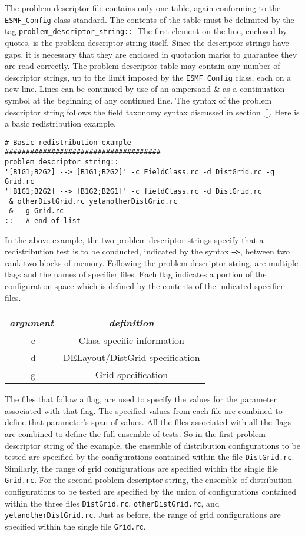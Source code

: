 The problem descriptor file contains only one table, again conforming to the \texttt{ESMF\_Config} class standard. The contents of the table must be delimited by the tag \texttt{problem\_descriptor\_string::}. The first element on the line, enclosed by quotes, is the problem descriptor string itself. Since the descriptor strings have gaps, it is necessary that they are enclosed in quotation marks to guarantee they are read correctly. The problem descriptor table may contain any number of descriptor strings, up to the limit imposed by the \texttt{ESMF\_Config} class, each on a new line. Lines can be continued by use of an ampersand {\&} as a continuation symbol at the beginning of any continued line. The syntax of the problem descriptor string follows the field taxonomy syntax discussed in section~\ref{}. Here is a basic redistribution example.
\begin{verbatim}
# Basic redistribution example
#####################################
problem_descriptor_string::
'[B1G1;B2G2] --> [B1G1;B2G2]' -c FieldClass.rc -d DistGrid.rc -g Grid.rc 
'[B1G1;B2G2] --> [B1G2;B2G1]' -c fieldClass.rc -d DistGrid.rc 
 & otherDistGrid.rc yetanotherDistGrid.rc
 &  -g Grid.rc   
::   # end of list
\end{verbatim}
In the above example, the two problem descriptor strings specify that a redistribution test is to be conducted, indicated by the syntax  \texttt{-->}, between two rank two blocks of memory. Following the problem descriptor string, are multiple flags and the names of specifier files. Each flag indicates a portion of the configuration space which is defined by the contents of the indicated specifier files.  
\begin{center}
\begin{tabular}{| c | c |} \hline \hline
{\em argument } & {\em definition} \\
\hline
-c &  Class specific information \\
-d & DELayout/DistGrid specification \\
-g & Grid specification \\
\hline 
\end{tabular}
\end{center}
The files that follow a flag, are used to specify the values for the parameter associated with that flag. The specified values from each file are combined to define that parameter's span of values.  All the files associated with all the flags are combined to define the full ensemble of tests. So in the first problem descriptor string of the example, the ensemble of distribution configurations to be tested are specified by the configurations contained within the file \texttt{DistGrid.rc}. Similarly, the range of grid configurations are specified within the single file \texttt{Grid.rc}. For the second problem descriptor string, the ensemble of distribution configurations to be tested are specified by the union of configurations contained within the three files \texttt{DistGrid.rc}, \texttt{otherDistGrid.rc}, and \texttt{yetanotherDistGrid.rc}. Just as before, the range of grid configurations are specified within the single file \texttt{Grid.rc}.



